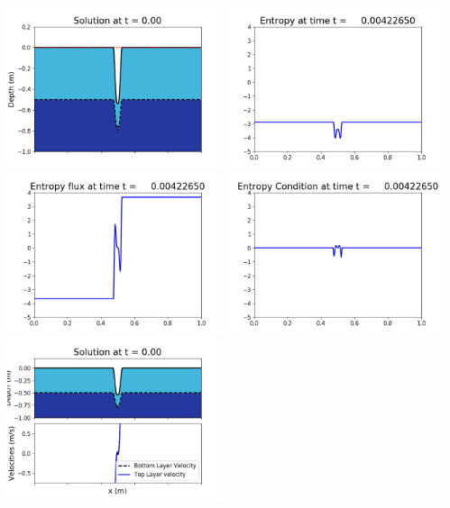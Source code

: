 \documentclass[11pt]{article}
\begin{document}
\includegraphics[width=0.475\textwidth]{frame0013fig1006.png}
\vskip 10pt 
\includegraphics[width=0.475\textwidth]{frame0013fig1007.png}
\includegraphics[width=0.475\textwidth]{frame0013fig1008.png}
\vskip 10pt 
\includegraphics[width=0.475\textwidth]{frame0013fig1009.png}
\vskip 10pt 
\includegraphics[width=0.475\textwidth]{frame0014fig1001.png}
\end{document}

